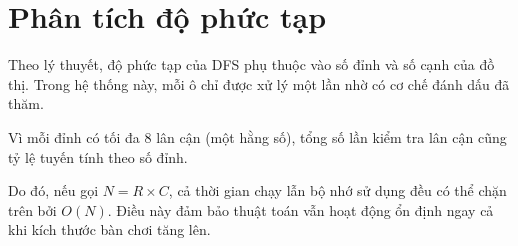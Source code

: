 \section{Phân tích độ phức tạp}

Theo lý thuyết, độ phức tạp của DFS phụ thuộc vào số đỉnh và số cạnh của đồ thị. Trong hệ thống này, mỗi ô chỉ được xử lý một lần nhờ có cơ chế đánh dấu đã thăm.

Vì mỗi đỉnh có tối đa 8 lân cận (một hằng số), tổng số lần kiểm tra lân cận cũng tỷ lệ tuyến tính theo số đỉnh.

Do đó, nếu gọi $N = R \times C$, cả thời gian chạy lẫn bộ nhớ sử dụng đều có thể chặn trên bởi $O(N)$. Điều này đảm bảo thuật toán vẫn hoạt động ổn định ngay cả khi kích thước bàn chơi tăng lên.